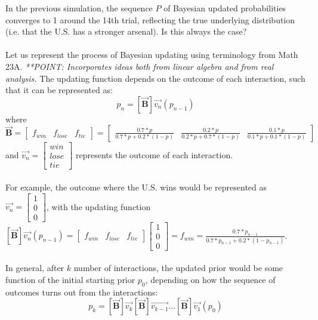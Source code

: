\documentclass[12pt]{article}
\begin{document}
In the previous simulation, the sequence $P$ of Bayesian updated probabilities converges to 1 around the 14th trial, reflecting the true underlying distribution (i.e. that the U.S. has a stronger arsenal). Is this always the case?\\
\\
Let us represent the process of Bayesian updating using terminology from Math 23A. \textit{**POINT: Incorporates ideas both from linear algebra and from real analysis.} The updating function depends on the outcome of each interaction, such that it can be represented as:\\
$$p_n=[\vec{\mathbf{B}}] \vec{v_n} (p_{n-1})$$
where $\vec{\mathbf{B}}=\begin{bmatrix} f_{win} & f_{lose} & f_{tie} \end{bmatrix}=\begin{bmatrix} \frac{0.7*p}{0.7*p+0.2*(1-p)} & \frac{0.2*p}{0.2*p+0.7*(1-p)}  & \frac{0.1*p}{0.1*p+0.1*(1-p)}  \end{bmatrix}$\\
and $\vec{v_n}=\begin{bmatrix} win \\ lose \\ tie \end{bmatrix}$ represents the outcome of each interaction.\\
\\
For example, the outcome where the U.S. wins would be represented as $\vec{v_n}=\begin{bmatrix} 1 \\ 0 \\ 0 \end{bmatrix}$, with the updating function $[\vec{\mathbf{B}}] \vec{v_n} (p_{n-1})=\begin{bmatrix} f_{win} & f_{lose} & f_{tie} \end{bmatrix} \begin{bmatrix} 1 \\ 0 \\ 0 \end{bmatrix} = f_{win} = \frac{0.7*p_{n-1}}{0.7*p_{n-1}+0.2*(1-p_{n-1})}$.\\
\\
In general, after $k$ number of interactions, the updated prior would be some function of the initial starting prior $p_0$, depending on how the sequence of outcomes turns out from the interactions:\\
$$p_k=[\vec{\mathbf{B}}] \vec{v_k} [\vec{\mathbf{B}}] \vec{v_{k-1}} \dots [\vec{\mathbf{B}}] \vec{v_1} (p_0)$$
\end{document}
